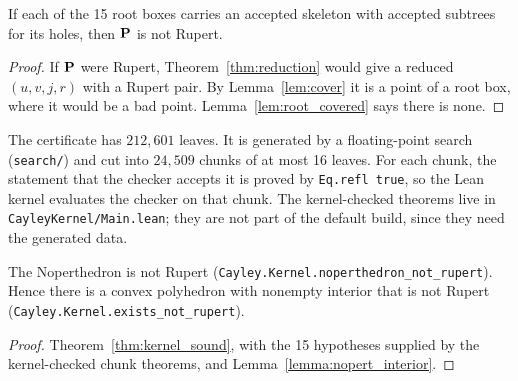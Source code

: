 \begin{theorem}[Soundness]
\label{thm:kernel_sound}
\leanok
{}
If each of the 15 root boxes carries an accepted skeleton with accepted subtrees for its
holes, then $\operatorname{\mathbf{P}}$ is not Rupert.
\end{theorem}
\begin{proof}
\leanok
If $\operatorname{\mathbf{P}}$ were Rupert, Theorem~\ref{thm:reduction} would give a reduced
$(u, v, j, r)$ with a Rupert pair. By Lemma~\ref{lem:cover} it is a point of a root box,
where it would be a bad point. Lemma~\ref{lem:root_covered} says there is none.
\end{proof}

The certificate has $212{,}601$ leaves. It is generated by a floating-point search
(\texttt{search/}) and cut into $24{,}509$ chunks of at most 16 leaves. For each
chunk, the statement that the checker accepts it is proved by \texttt{Eq.refl true}, so
the Lean kernel evaluates the checker on that chunk. The kernel-checked theorems live in
\texttt{CayleyKernel/Main.lean}; they are not part of the default build, since they
need the generated data.

\begin{theorem}
\label{thm:main}
\leanok
{}
The Noperthedron is not Rupert (\texttt{Cayley.Kernel.noperthedron\_not\_rupert}). Hence
there is a convex polyhedron with nonempty interior that is not Rupert
(\texttt{Cayley.Kernel.exists\_not\_rupert}).
\end{theorem}
\begin{proof}
\leanok
Theorem~\ref{thm:kernel_sound}, with the 15 hypotheses supplied by the kernel-checked
chunk theorems, and Lemma~\ref{lemma:nopert_interior}.
\end{proof}
